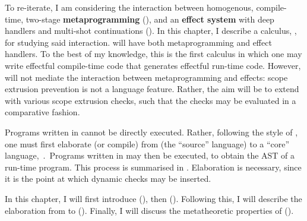 To re-iterate, I am considering the interaction between homogenous, compile-time, two-stage \textbf{metaprogramming} (), and an \textbf{effect system} with deep handlers and multi-shot continuations (). In this chapter, I describe a calculus, \calculusName{}, for studying said interaction. \calculusName{} will have both metaprogramming and effect handlers. To the best of my knowledge, this is the first calculus in which one may write effectful compile-time code that generates effectful run-time code. However, \calculusName{} will not mediate the interaction between metaprogramming and effects: scope extrusion prevention is not a language feature. Rather, the aim will be to extend \calculusName{} with various scope extrusion checks, such that the checks may be evaluated in a comparative fashion. 

Programs written in \calculusName{} cannot be directly executed. Rather, following the style of \citet{xie-2023}, one must first elaborate (or compile) from \calculusName{} (the ``source'' language) to a ``core'' language,\, \coreLang{}.\, Programs written in \coreLang{} may then be executed, to obtain the AST of a run-time \efflang{} program. This process is summarised in . Elaboration is necessary, since it is the point at which dynamic checks may be inserted. 

In this chapter, I will first introduce \sourceLang{} (), then \coreLang{} (). Following this, I will describe the elaboration from \sourceLang{} to \coreLang{} (). Finally, I will discuss the metatheoretic properties of \calculusName{} (). 

